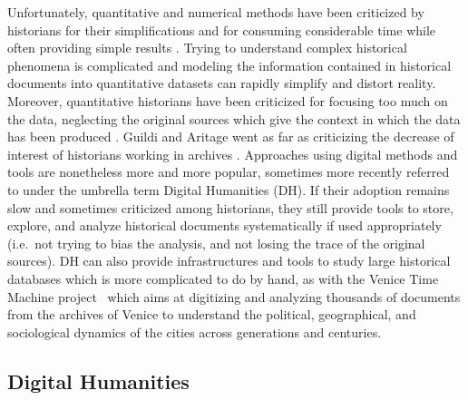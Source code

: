 Unfortunately, quantitative and numerical methods have been criticized by historians for their simplifications and for consuming considerable time while often providing simple results \cite{karila-cohenNouvellesCuisinesHistoire2018,lepetitHistoireQuantitativeDeux1989}.
Trying to understand complex historical phenomena is complicated and modeling the information contained in historical documents into quantitative datasets can rapidly simplify and distort reality.
Moreover, quantitative historians have been criticized for focusing too much on the data, neglecting the original sources which give the context in which the data has been produced \cite{lemercierQuantitativeMethodsHumanities2019}.
Guildi and Aritage went as far as criticizing the decrease of interest of historians working in archives \cite{guldiHistoryManifesto2014}.
Approaches using digital methods and tools are nonetheless more and more popular, sometimes more recently referred to under the umbrella term Digital Humanities (DH).
If their adoption remains slow and sometimes criticized among historians, they still provide tools to store, explore, and analyze historical documents systematically if used appropriately (i.e.\ not trying to bias the analysis, and not losing the trace of the original sources).
DH can also provide infrastructures and tools to study large historical databases which is more complicated to do by hand, as with the Venice Time Machine project~\cite{kaplanVeniceTimeMachine2015} which aims at digitizing and analyzing thousands of documents from the archives of Venice to understand the political, geographical, and sociological dynamics of the cities across generations and centuries.



\subsection{Digital Humanities}\label{subsec:DH}

